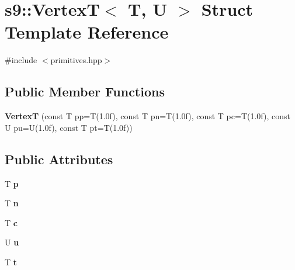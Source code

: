 \hypertarget{structs9_1_1VertexT}{\section{s9\-:\-:Vertex\-T$<$ T, U $>$ Struct Template Reference}
\label{structs9_1_1VertexT}
}


{\ttfamily \#include $<$primitives.\-hpp$>$}

\subsection*{Public Member Functions}
\begin{DoxyCompactItemize}
\item 
\hypertarget{structs9_1_1VertexT_ac360d39a7e7b3289ca6c1418fa2ed5b7}{{\bfseries Vertex\-T} (const T pp=T(1.\-0f), const T pn=\-T(1.\-0f), const T pc=\-T(1.\-0f), const U pu=\-U(1.\-0f), const T pt=\-T(1.\-0f))}\label{structs9_1_1VertexT_ac360d39a7e7b3289ca6c1418fa2ed5b7}

\end{DoxyCompactItemize}
\subsection*{Public Attributes}
\begin{DoxyCompactItemize}
\item 
\hypertarget{structs9_1_1VertexT_a85c5642c074508dd159fa4497c6b2a0c}{T {\bfseries p}}\label{structs9_1_1VertexT_a85c5642c074508dd159fa4497c6b2a0c}

\item 
\hypertarget{structs9_1_1VertexT_a0327b7e4fa535f6a16b12374d980c18b}{T {\bfseries n}}\label{structs9_1_1VertexT_a0327b7e4fa535f6a16b12374d980c18b}

\item 
\hypertarget{structs9_1_1VertexT_a0906bc2a04c5bf12d5483daaab81bc28}{T {\bfseries c}}\label{structs9_1_1VertexT_a0906bc2a04c5bf12d5483daaab81bc28}

\item 
\hypertarget{structs9_1_1VertexT_a85c4511e84ea1e51b1a5896dbe583af2}{U {\bfseries u}}\label{structs9_1_1VertexT_a85c4511e84ea1e51b1a5896dbe583af2}

\item 
\hypertarget{structs9_1_1VertexT_ac5ff8b99b43ed9d61069f65745757d66}{T {\bfseries t}}\label{structs9_1_1VertexT_ac5ff8b99b43ed9d61069f65745757d66}

\end{DoxyCompactItemize}


